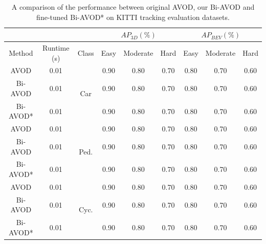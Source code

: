 \documentclass{bmvc2k}
\begin{document}
\begin{table}[]\centering
	\footnotesize
	\begin{tabular}{ccccccccc}
				 &   		   &  											& \multicolumn{3}{c}{$AP_{3D}(\%)$}  		 & \multicolumn{3}{c}{$AP_{BEV}(\%)$} \\ \toprule[1.5pt]
		Method   & Runtime (s) & \multicolumn{1}{c|}{Class}  				& Easy & Moderate & \multicolumn{1}{c|}{Hard} & Easy    & Moderate    & Hard    \\ \midrule
		AVOD     & 0.01        & \multicolumn{1}{c|}{\multirow{3}{*}{Car}}  & 0.90 & 0.80     & \multicolumn{1}{c|}{0.70} & 0.80    & 0.70        & 0.60    \\
		Bi-AVOD  & 0.01        & \multicolumn{1}{c|}{}                      & 0.90 & 0.80     & \multicolumn{1}{c|}{0.70} & 0.80    & 0.70        & 0.60    \\
		Bi-AVOD* & 0.01        & \multicolumn{1}{c|}{}                      & 0.90 & 0.80     & \multicolumn{1}{c|}{0.70} & 0.80    & 0.70        & 0.60    \\ \midrule
		AVOD     & 0.01        & \multicolumn{1}{c|}{\multirow{3}{*}{Ped.}} & 0.90 & 0.80     & \multicolumn{1}{c|}{0.70} & 0.80    & 0.70        & 0.60    \\
		Bi-AVOD  & 0.01        & \multicolumn{1}{c|}{}                      & 0.90 & 0.80     & \multicolumn{1}{c|}{0.70} & 0.80    & 0.70        & 0.60    \\
		Bi-AVOD* & 0.01        & \multicolumn{1}{c|}{}                      & 0.90 & 0.80     & \multicolumn{1}{c|}{0.70} & 0.80    & 0.70        & 0.60    \\ \midrule
		AVOD     & 0.01        & \multicolumn{1}{c|}{\multirow{3}{*}{Cyc.}} & 0.90 & 0.80     & \multicolumn{1}{c|}{0.70} & 0.80    & 0.70        & 0.60    \\
		Bi-AVOD  & 0.01        & \multicolumn{1}{c|}{}                      & 0.90 & 0.80     & \multicolumn{1}{c|}{0.70} & 0.80    & 0.70        & 0.60    \\
		Bi-AVOD* & 0.01        & \multicolumn{1}{c|}{}                      & 0.90 & 0.80     & \multicolumn{1}{c|}{0.70} & 0.80    & 0.70        & 0.60    \\
		\bottomrule[1.5pt]
	\end{tabular}
	\setlength{\abovecaptionskip}{1pt}
	\caption{A comparison of the performance between original AVOD, our Bi-AVOD and fine-tuned Bi-AVOD* on KITTI tracking evaluation datasets.}
	\label{table:result_detection}
\end{table}
\end{document}
